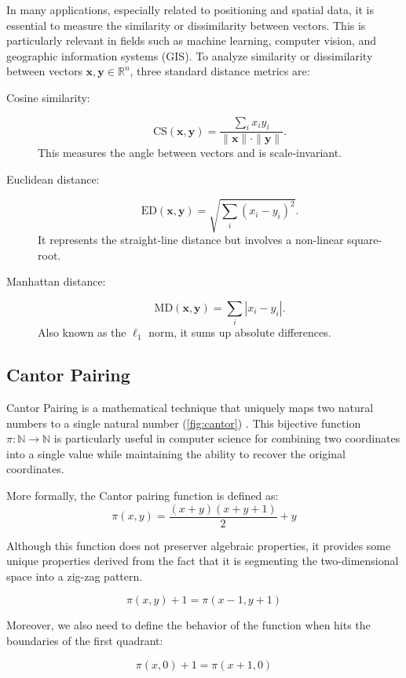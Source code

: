In many applications, especially related to positioning and spatial data, it is essential to measure the similarity or dissimilarity between vectors. This is particularly relevant in fields such as machine learning, computer vision, and geographic information systems (GIS). To analyze similarity or dissimilarity between vectors $\mathbf{x}, \mathbf{y} \in \mathbb{R}^n$, three standard distance metrics are:

\begin{description}
  \item[Cosine similarity:]
  \[
    \mathrm{CS}(\mathbf{x}, \mathbf{y}) 
    = \frac{\sum_i x_i y_i}{\|\mathbf{x}\| \cdot \|\mathbf{y}\|}.
  \]
  This measures the angle between vectors and is scale‑invariant.

  \item[Euclidean distance:]
  \[
    \mathrm{ED}(\mathbf{x}, \mathbf{y}) 
    = \sqrt{\sum_i (x_i - y_i)^2}.
  \]
  It represents the straight-line distance but involves a non-linear square-root.

  \item[Manhattan distance:]
  \[
    \mathrm{MD}(\mathbf{x}, \mathbf{y}) 
    = \sum_i |x_i - y_i|.
  \]
  Also known as the $\ell_1$ norm, it sums up absolute differences.
\end{description}
\subsection{Cantor Pairing}

Cantor Pairing is a mathematical technique that uniquely maps two natural numbers to a single natural number (\cref{fig:cantor}) . This bijective function $\pi: \mathbb{N} \to \mathbb{N}$ is particularly useful in computer science for combining two coordinates into a single value while maintaining the ability to recover the original coordinates.

More formally, the Cantor pairing function is defined as:
\[
    \pi(x, y) = \frac{(x + y)(x + y + 1)}{2} + y
\]

Although this function does not preserver algebraic properties, it provides some unique properties derived from the fact that it is segmenting the two-dimensional space into a zig-zag pattern.

\[
    \pi(x, y) + 1 = \pi(x - 1, y + 1)
\]

Moreover, we also need to define the behavior of the function when hits the boundaries of the first quadrant:

\[
    \pi(x, 0) + 1 = \pi(x + 1, 0)
\]

